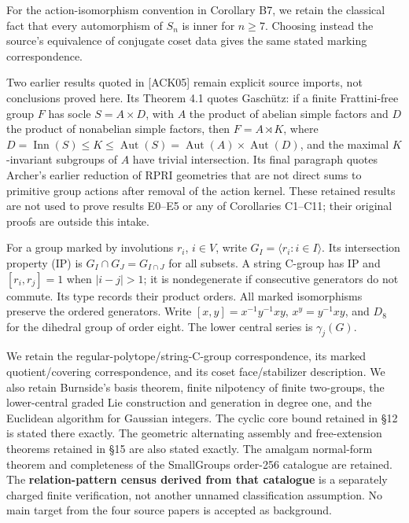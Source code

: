 \documentclass[
  10pt,
  letterpaper,
]{article}
\begin{document}
For the action-isomorphism convention in Corollary B7, we retain the
classical fact that every automorphism of \(S_n\) is inner for
\(n\geq7\). Choosing instead the source's equivalence of conjugate coset
data gives the same stated marking correspondence.

Two earlier results quoted in {[}ACK05{]} remain explicit source
imports, not conclusions proved here. Its Theorem 4.1 quotes Gaschütz:
if a finite Frattini-free group \(F\) has socle \(S=A\times D\), with
\(A\) the product of abelian simple factors and \(D\) the product of
nonabelian simple factors, then \(F=A\rtimes K\), where
\(D=\operatorname{Inn}(S)\leq K\leq\operatorname{Aut}(S)=\operatorname{Aut}(A)\times\operatorname{Aut}(D)\),
and the maximal \(K\)-invariant subgroups of \(A\) have trivial
intersection. Its final paragraph quotes Archer's earlier reduction of
RPRI geometries that are not direct sums to primitive group actions
after removal of the action kernel. These retained results are not used
to prove results E0--E5 or any of Corollaries C1--C11; their original
proofs are outside this intake.

For a group marked by involutions \(r_i\), \(i\in V\), write
\(G_I=\langle r_i:i\in I\rangle\). Its intersection property (IP) is
\(G_I\cap G_J=G_{I\cap J}\) for all subsets. A string C-group has IP and
\([r_i,r_j]=1\) when \(|i-j|>1\); it is nondegenerate if consecutive
generators do not commute. Its type records their product orders. All
marked isomorphisms preserve the ordered generators. Write
\([x,y]=x^{-1}y^{-1}xy\), \(x^y=y^{-1}xy\), and \(D_8\) for the dihedral
group of order eight. The lower central series is \(\gamma_j(G)\).

We retain the regular-polytope/string-C-group correspondence, its marked
quotient/covering correspondence, and its coset face/stabilizer
description. We also retain Burnside's basis theorem, finite nilpotency
of finite two-groups, the lower-central graded Lie construction and
generation in degree one, and the Euclidean algorithm for Gaussian
integers. The cyclic core bound retained in §12 is stated there exactly.
The geometric alternating assembly and free-extension theorems retained
in §15 are also stated exactly. The amalgam normal-form theorem and
completeness of the SmallGroups order-256 catalogue are retained. The
\textbf{relation-pattern census derived from that catalogue} is a
separately charged finite verification, not another unnamed
classification assumption. No main target from the four source papers is
accepted as background.
\end{document}
